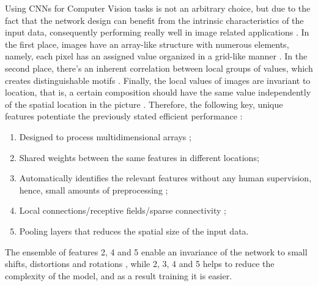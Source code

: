 \documentclass[class=report, crop=false, a4paper, 12pt]{standalone}
\begin{document}
\par Using CNNs for Computer Vision tasks is not an arbitrary choice, but due to the fact that the network design can benefit from the intrinsic characteristics of the input data, consequently performing really well in image related applications \autocite{lecunDeepLearning2015,caoReviewNeuralNetworks2018}. In the first place, images have an array-like structure with numerous elements, namely, each pixel has an assigned value organized in a grid-like manner \autocite{yamashitaConvolutionalNeuralNetworks2018}. In the second place, there's an inherent correlation between local groups of values, which creates distinguishable motifs \autocite{lecunDeepLearning2015}. Finally, the local values of images are invariant to location, that is, a certain composition should have the same value independently of the spatial location in the picture \autocite{lecunDeepLearning2015}. Therefore, the following key, unique features potentiate the previously stated efficient performance \autocite{caoReviewNeuralNetworks2018}:
\begin{enumerate}
    \item Designed to process multidimensional arrays \autocite{lecunDeepLearning2015};
    \item Shared weights between the same features in different locations; %
    \item Automatically identifies the relevant features without any human supervision, hence, small amounts of preprocessing \autocite{alzubaidiReviewDeepLearning2021,liSurveyConvolutionalNeural2022}; %
    \item Local connections/receptive fields/sparse connectivity \autocite{alzubaidiReviewDeepLearning2021}; %
    \item Pooling layers that reduces the spatial size of the input data. %
\end{enumerate}

The ensemble of features 2, 4 and 5 enable an invariance of the network to small shifts, distortions and rotations , while 2, 3, 4 and 5 helps to reduce the complexity of the model, and as a result training it is easier.
\end{document}
